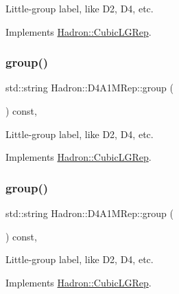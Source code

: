 Little-\/group label, like D2, D4, etc. 

Implements \mbox{\hyperlink{structHadron_1_1CubicLGRep_a9bdb14b519a611d21379ed96a3a9eb41}{Hadron\+::\+Cubic\+L\+G\+Rep}}.

\mbox{\label{structHadron_1_1D4A1MRep_a6329fe3f65d0c5a6538aa917500428b7}} 
\subsubsection{\texorpdfstring{group()}{group()}\hspace{0.1cm}{\footnotesize\ttfamily [2/3]}}
{\footnotesize\ttfamily std\+::string Hadron\+::\+D4\+A1\+M\+Rep\+::group (\begin{DoxyParamCaption}{ }\end{DoxyParamCaption}) const\hspace{0.3cm}{\ttfamily [inline]}, {\ttfamily [virtual]}}

Little-\/group label, like D2, D4, etc. 

Implements \mbox{\hyperlink{structHadron_1_1CubicLGRep_a9bdb14b519a611d21379ed96a3a9eb41}{Hadron\+::\+Cubic\+L\+G\+Rep}}.

\mbox{\label{structHadron_1_1D4A1MRep_a6329fe3f65d0c5a6538aa917500428b7}} 
\subsubsection{\texorpdfstring{group()}{group()}\hspace{0.1cm}{\footnotesize\ttfamily [3/3]}}
{\footnotesize\ttfamily std\+::string Hadron\+::\+D4\+A1\+M\+Rep\+::group (\begin{DoxyParamCaption}{ }\end{DoxyParamCaption}) const\hspace{0.3cm}{\ttfamily [inline]}, {\ttfamily [virtual]}}

Little-\/group label, like D2, D4, etc. 

Implements \mbox{\hyperlink{structHadron_1_1CubicLGRep_a9bdb14b519a611d21379ed96a3a9eb41}{Hadron\+::\+Cubic\+L\+G\+Rep}}.

\mbox{\label{structHadron_1_1D4A1MRep_adbca586cc67ec998e597be4d2e251c8d}} 
